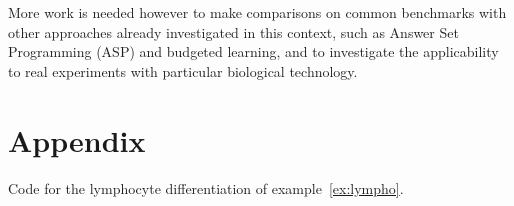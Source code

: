 \documentclass{llncs}
\begin{document}
More work is needed however to make comparisons on common benchmarks
with  other approaches already investigated in this context, such as Answer Set Programming (ASP) and budgeted learning,
and to investigate the applicability to real experiments with particular biological technology.




\section*{Appendix}
\begin{listfig}[H]

\caption{Code for the lymphocyte differentiation of example~\ref{ex:lympho}.\label{bool-lympho}}
\end{listfig}
\end{document}
